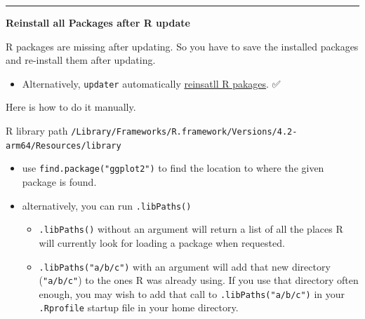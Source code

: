 \documentclass[
  a4paper,
  twoside,
  openright]{book}
\newenvironment{Shaded}{\begin{snugshade}}{\end{snugshade}}
\newcommand{\AttributeTok}[1]{\textcolor[rgb]{0.13,0.29,0.53}{#1}}
\newcommand{\CommentTok}[1]{\textcolor[rgb]{0.56,0.35,0.01}{\textit{#1}}}
\newcommand{\ConstantTok}[1]{\textcolor[rgb]{0.56,0.35,0.01}{#1}}
\newcommand{\DecValTok}[1]{\textcolor[rgb]{0.00,0.00,0.81}{#1}}
\newcommand{\DocumentationTok}[1]{\textcolor[rgb]{0.56,0.35,0.01}{\textbf{\textit{#1}}}}
\newcommand{\FunctionTok}[1]{\textcolor[rgb]{0.13,0.29,0.53}{\textbf{#1}}}
\newcommand{\NormalTok}[1]{#1}
\newcommand{\OtherTok}[1]{\textcolor[rgb]{0.56,0.35,0.01}{#1}}
\newcommand{\SpecialCharTok}[1]{\textcolor[rgb]{0.81,0.36,0.00}{\textbf{#1}}}
\newcommand{\StringTok}[1]{\textcolor[rgb]{0.31,0.60,0.02}{#1}}
\providecommand{\tightlist}{%
  \setlength{\itemsep}{0pt}\setlength{\parskip}{0pt}}
\theoremstyle{definition}
\theoremstyle{definition}
\theoremstyle{definition}
\theoremstyle{definition}
\theoremstyle{remark}
\begin{document}
\begin{center}\rule{0.5\linewidth}{0.5pt}\end{center}

\textbf{Reinstall all Packages after {R update}}

R packages are missing after updating. So you have to save the installed packages and re-install them after updating.

\begin{itemize}
\tightlist
\item
  Alternatively, \texttt{updater} automatically \hyperref[update-r]{reinsatll R pakages}. ✅
\end{itemize}

Here is how to do it manually.

\begin{Shaded}
\end{Shaded}

R library path \texttt{/Library/Frameworks/R.framework/Versions/4.2-arm64/Resources/library}

\begin{itemize}
\tightlist
\item
  use \texttt{find.package("ggplot2")} to find the location to where the given package is found.
\item
  alternatively, you can run \texttt{.libPaths()}

  \begin{itemize}
  \tightlist
  \item
    \texttt{.libPaths()} without an argument will return a list of all the places R will currently look for loading a package when requested.
  \item
    \texttt{.libPaths("a/b/c")} with an argument will add that new directory (\texttt{"a/b/c"}) to the ones R was already using. If you use that directory often enough, you may wish to add that call to \texttt{.libPaths("a/b/c")} in your \texttt{.Rprofile} startup file in your home directory.
  \end{itemize}
\end{itemize}
\end{document}
